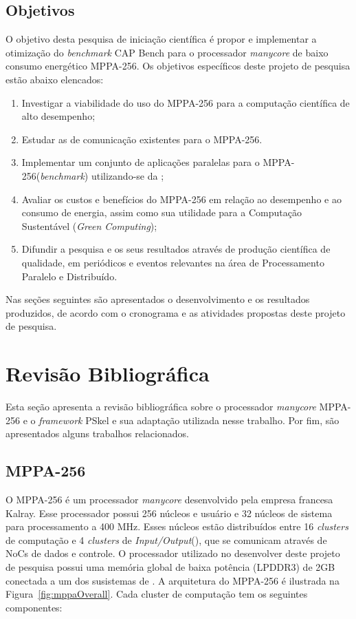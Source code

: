 \documentclass[a4paper,11pt]{article}
\newcommand{\mppa}{MPPA-256\xspace}
\newcommand{\capb}{CAP Bench\xspace}
\newcommand{\manycore}{\textit{manycore}\xspace}
\newcommand{\bench}{\textit{benchmark}\xspace}
\begin{document}
\subsection{Objetivos}

O objetivo desta pesquisa de iniciação científica é propor e implementar a otimização do \bench \capb para o processador \manycore de baixo consumo energético \mppa. Os objetivos específicos deste projeto de pesquisa estão abaixo elencados:

\begin{enumerate}
	\setlength\itemsep{0em}
	\item Investigar a viabilidade do uso do \mppa para a computação científica de alto desempenho;
	\item Estudar as \apis de comunicação existentes para o \mppa.
	\item Implementar um conjunto de aplicações paralelas para o \mppa (\bench) utilizando-se da \api \async;
	\item Avaliar os custos e benefícios do \mppa em relação ao desempenho e ao consumo de energia, assim como sua utilidade para a Computação Sustentável (\textit{Green Computing});
	\item Difundir a pesquisa e os seus resultados através de produção científica de qualidade, em periódicos e eventos relevantes na área de Processamento Paralelo e Distribuído.
\end{enumerate}

Nas seções seguintes são apresentados o desenvolvimento e os resultados produzidos, de acordo com o cronograma e as atividades propostas deste projeto de pesquisa.

\section{Revisão Bibliográfica}

Esta seção apresenta a revisão bibliográfica sobre o processador \textit{manycore} \mppa e o \textit{framework} PSkel e sua adaptação utilizada nesse trabalho. Por fim, são apresentados alguns trabalhos relacionados.

\subsection{MPPA-256}
\label{subsec:mppa}

O \mppa é um processador \textit{manycore} desenvolvido pela empresa francesa
Kalray. Esse processador possui 256 núcleos e usuário e 32 núcleos de sistema para processamento a 400 MHz. Esses núcleos estão distribuídos entre 16 \emph{clusters} de computação e 4 \emph{clusters} de \emph{Input/Output}(\io), que se comunicam através de NoCs de dados e controle. O processador utilizado no desenvolver deste projeto de pesquisa possui uma memória global de baixa potência (LPDDR3) de 2GB conectada a um dos susistemas de \io. A arquitetura do \mppa é ilustrada na Figura~\ref{fig:mppaOverall}. Cada cluster de computação tem os seguintes componentes:
\end{document}
